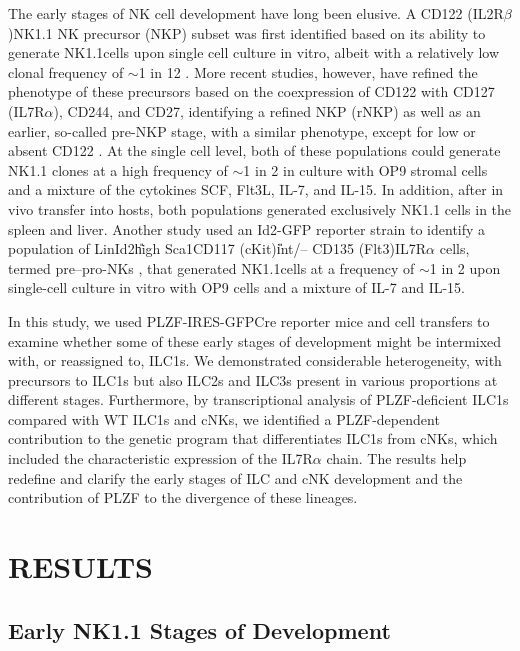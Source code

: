The early stages of NK cell development have long been elusive. A \CDte\UM CD122 (IL2R$\beta$)\UP NK1.1\UM{} NK precursor (NKP) subset was first identified based on its ability to generate NK1.1\UP cells upon single cell culture in vitro, albeit with a relatively low clonal frequency of $\sim$1 in 12 \cite{kim2002,rosmaraki2001}. More recent studies, however, have refined the phenotype of these precursors based on the coexpression of CD122 with CD127 (IL7R$\alpha$), CD244, and CD27, identifying a refined NKP (rNKP) as well as an earlier, so-called pre-NKP stage, with a similar phenotype, except for low or absent CD122 \cite{fathman2011}. At the single cell level, both of these populations could generate \CDte\UM NK1.1\UP{} clones at a high frequency of $\sim$1 in 2 in culture with OP9 stromal cells and a mixture of the cytokines SCF, Flt3L, IL-7, and IL-15. In addition, after in vivo transfer into \Ragrg hosts, both populations generated exclusively \CDte\UM NK1.1\UP{} cells in the spleen and liver. Another study used an Id2-GFP reporter strain to identify a population of Lin\UM Id2\U{high} Sca1\UP CD117 (cKit)\U{int/--} CD135 (Flt3)\UM IL7R$\alpha$\UP{} cells, termed pre–pro-NKs \cite{carotta2011}, that generated \CDte\UM NK1.1\UP cells at a frequency of $\sim$1 in 2 upon single-cell culture in vitro with OP9 cells and a mixture of IL-7 and IL-15.

In this study, we used PLZF-IRES-GFPCre reporter mice and cell transfers to examine whether some of these early stages of development might be intermixed with, or reassigned to, ILC1s. We demonstrated considerable heterogeneity, with precursors to ILC1s but also ILC2s and ILC3s present in various proportions at different stages. Furthermore, by transcriptional analysis of PLZF-deficient ILC1s compared with WT ILC1s and cNKs, we identified a PLZF-dependent contribution to the genetic program that differentiates ILC1s from cNKs, which included the characteristic expression of the IL7R$\alpha$ chain. The results help redefine and clarify the early stages of ILC and cNK development and the contribution of PLZF to the divergence of these lineages.

\section{RESULTS}

\subsection{Early NK1.1\UM{} Stages of Development}

